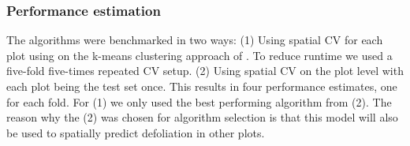 \documentclass[review]{elsarticle}
\begin{document}



\subsubsection{Performance estimation}

The algorithms were benchmarked in two ways:
(1) Using spatial \ac{CV} for each plot using on the k-means clustering approach of \cite{Brenning2012}. To reduce runtime we used a five-fold five-times repeated CV setup.
(2) Using spatial \ac{CV} on the plot level with each plot being the test set once. This results in four performance estimates, one for each fold.
For (1) we only used the best performing algorithm from (2).
The reason why the (2) was chosen for algorithm selection is that this model will also be used to spatially predict defoliation in other plots.
\end{document}
